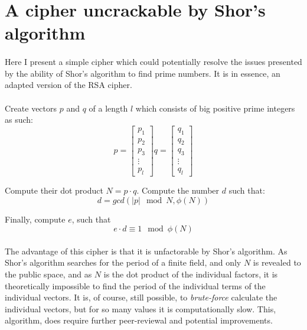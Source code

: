 \documentclass[a4paper, 10pt]{article}
\begin{document}
\section{A cipher uncrackable by Shor's algorithm}
\paragraph*{}
Here I present a simple cipher which could potentially resolve the issues presented by the ability of Shor's algorithm 
to find prime numbers. It is in essence, an adapted version of the RSA cipher.

\paragraph*{}
Create vectors $p$ and $q$ of a length $l$ which consists of big positive prime integers as such:
$$p = 
\begin{bmatrix}
p_1 \\
p_2 \\
p_3 \\
\vdots \\
p_l
\end{bmatrix}
q = 
\begin{bmatrix}
q_1 \\
q_2 \\
q_3 \\
\vdots \\
q_l
\end{bmatrix}
$$

Compute their dot product $N = p \cdot q$.
Compute the number $d$ such that:
$$d = gcd(|p| \mod N,\phi(N))$$

Finally, compute $e$, such that
$$e \cdot d \equiv 1 \mod \phi(N)$$

\paragraph*{}
The advantage of this cipher is that it is unfactorable by Shor's algorithm. As Shor's algorithm searches for the 
period of a finite field, and only $N$ is revealed to the public space, and as $N$ is the dot product of the 
individual factors, it is theoretically impossible to find the period of the individual terms of the individual 
vectors. It is, of course, still possible, to \textit{brute-force} calculate the individual vectors, but for so many 
values it is computationally slow. This, algorithm, does require further peer-reviewal and potential improvements.
\end{document}
